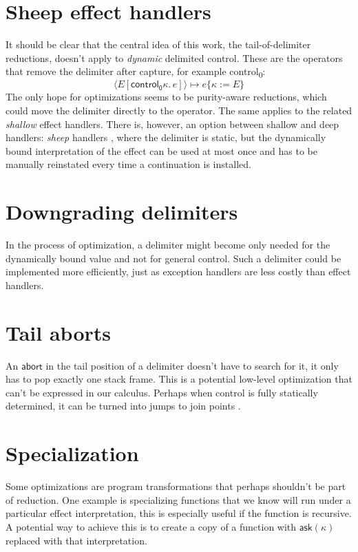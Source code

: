 \documentclass[a4paper, 11pt,titlepage, openright, twoside]{report}
\newcommand{\abort}{\textsf{abort}}
\newcommand{\Ask}{\textsf{ask}}
\newcommand{\subst}[2]{\{#1{:=}#2\}}
\newcommand{\+}{\enspace}
\begin{document}
\section{Sheep effect handlers}
It should be clear that the central idea of this work, the tail-of-delimiter reductions,
doesn't apply to \textit{dynamic} delimited control.
These are the operators that remove the delimiter after capture,
for example \textsf{control\textsubscript{0}}:
$$⟨E[\mathsf{control_0} κ.\,e]⟩ ↦ e\subst{κ}{E}$$
The only hope for optimizations seems to be purity-aware reductions,
which could move the delimiter directly to the operator. The same applies to the related \textit{shallow} effect handlers.
There is, however, an option between shallow and deep handlers: \textit{sheep} handlers \cite{sheep},
where the delimiter is static,
but the dynamically bound interpretation of the effect can be used at most once
and has to be manually reinstated every time a continuation is installed.

\section{Downgrading delimiters}
In the process of optimization,
a delimiter might become only needed for the dynamically bound value
and not for general control.
Such a delimiter could be implemented more efficiently,
just as exception handlers are less costly than effect handlers.

\section{Tail aborts}
An $\abort$ in the tail position of a delimiter
doesn't have to search for it,
it only has to pop exactly one stack frame.
This is a potential low-level optimization that can't be expressed in our calculus.
Perhaps when control is fully statically determined,
it can be turned into jumps to join points \cite{cwc}.

\section{Specialization}
Some optimizations are program transformations that perhaps shouldn't be part of reduction.
One example is specializing functions that we know will run under a particular effect interpretation,
this is especially useful if the function is recursive.
A potential way to achieve this is
to create a copy of a function with $\Ask(κ)$ replaced with that interpretation.
\end{document}
